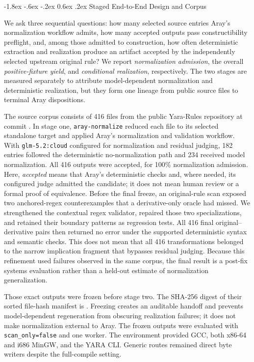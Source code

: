\documentclass[11pt,twocolumn]{article}
\makeatletter
\newcommand{\code}[1]{\texttt{#1}}
\renewcommand\subsection{\@startsection{subsection}{2}{\z@}%
  {-1.8ex \@plus -.6ex \@minus -.2ex}%
  {0.6ex \@plus .2ex}%
  {\normalfont\normalsize\bfseries}}
\makeatother
\begin{document}
\subsection{Staged End-to-End Design and Corpus}

We ask three sequential questions: how many selected source entries Aray's
normalization workflow admits, how many accepted outputs pass constructibility
preflight, and, among those admitted to construction, how often deterministic
extraction and realization produce an artifact accepted by the independently
selected upstream original rule? We report \emph{normalization admission}, the
overall \emph{positive-fixture yield}, and \emph{conditional realization},
respectively. The two stages are measured separately to attribute model-dependent
normalization and deterministic realization, but they form one lineage from
public source files to terminal Aray dispositions.

The source corpus consists of 416 files from the public Yara-Rules repository
\cite{yararules} at commit
\texttt{}. In stage one,
\code{aray-normalize} reduced each file to its selected standalone target and
applied Aray's normalization and validation workflow. With
\code{glm-5.2:cloud} configured for normalization and residual judging, 182
entries followed the deterministic no-normalization path and 234 received model
normalization. All 416 outputs were accepted, for 100\% normalization admission.
Here, \emph{accepted} means that Aray's deterministic checks and, where needed,
its configured judge admitted the candidate; it does not mean human review or a
formal proof of equivalence. Before the final freeze, an original-rule scan
exposed two anchored-regex counterexamples that a derivative-only oracle had
missed. We strengthened the contextual regex validator, repaired those two
specializations, and retained their boundary patterns as regression tests. All
416 final original--derivative pairs then returned no error under the supported
deterministic syntax and semantic checks. This does not mean that all 416
transformations belonged to the narrow implication fragment that bypasses
residual judging. Because this refinement used failures observed in the same
corpus, the final result is a post-fix systems evaluation rather than a held-out
estimate of normalization generalization.

Those exact outputs were frozen before stage two. The SHA-256 digest of their
sorted file-hash manifest is
\texttt{}.
Freezing creates an auditable handoff and prevents model-dependent regeneration
from obscuring realization failures; it does not make normalization external to
Aray. The frozen outputs were evaluated with \code{scan\_only=false} and one
worker. The environment provided GCC, both x86-64 and i686 MinGW, and the YARA
CLI. Generic routes remained direct byte writers despite the full-compile
setting.
\end{document}
